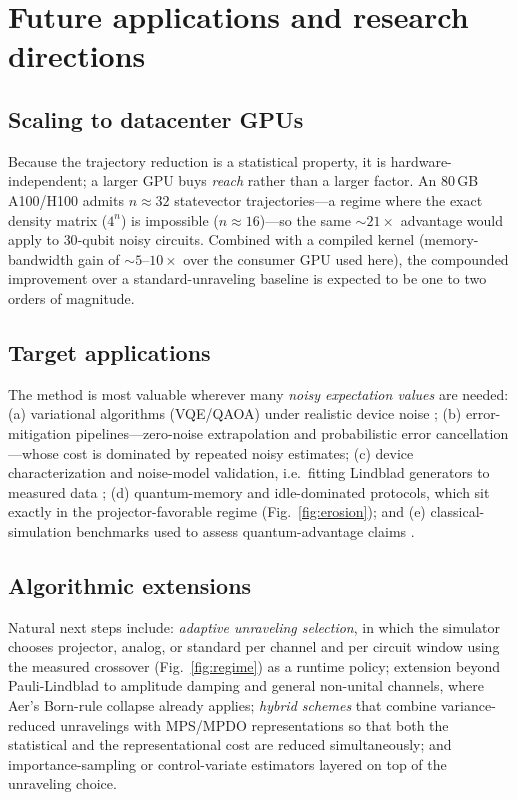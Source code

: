 \documentclass{ieeeaccess}
\begin{document}
\section{Future applications and research directions}\label{sec:future}

\subsection{Scaling to datacenter GPUs}
Because the trajectory reduction is a statistical property, it is hardware-independent; a larger GPU buys
\emph{reach} rather than a larger factor. An $80$\,GB A100/H100 admits $n\!\approx\!32$ statevector
trajectories---a regime where the exact density matrix ($4^n$) is impossible ($n\!\approx\!16$)---so the
same $\sim\!21\times$ advantage would apply to $30$-qubit noisy circuits. Combined with a compiled kernel
(memory-bandwidth gain of $\sim\!5$--$10\times$ over the consumer GPU used here), the compounded
improvement over a standard-unraveling baseline is expected to be one to two orders of magnitude.

\subsection{Target applications}
The method is most valuable wherever many \emph{noisy expectation values} are needed:
(a) variational algorithms (VQE/QAOA) under realistic device noise \cite{cerezo2021vqa,bharti2022nisq};
(b) error-mitigation pipelines---zero-noise extrapolation and probabilistic error cancellation
\cite{temme2017,kandala2019mitigation,endo2021mitigation,sparse_pauli_lindblad2023}---whose cost is
dominated by repeated noisy estimates; (c) device characterization and noise-model validation, i.e.\
fitting Lindblad generators to measured data \cite{georgopoulos2021modeling,nation2023suppressing};
(d) quantum-memory and idle-dominated protocols, which sit exactly in the projector-favorable regime
(Fig.~\ref{fig:erosion}); and (e) classical-simulation benchmarks used to assess quantum-advantage
claims \cite{arute2019supremacy,pan2022sycamore,kim2023utility}.

\subsection{Algorithmic extensions}
Natural next steps include: \emph{adaptive unraveling selection}, in which the simulator chooses
projector, analog, or standard per channel and per circuit window using the measured crossover
(Fig.~\ref{fig:regime}) as a runtime policy; extension beyond Pauli-Lindblad to amplitude damping and
general non-unital channels, where Aer's Born-rule collapse already applies; \emph{hybrid schemes} that
combine variance-reduced unravelings with MPS/MPDO representations
\cite{tjm2026,verstraete2004mpdo,mpdo_prr,lpdo2023} so that both the statistical and the representational
cost are reduced simultaneously; and importance-sampling or control-variate estimators layered on top of
the unraveling choice.
\end{document}
